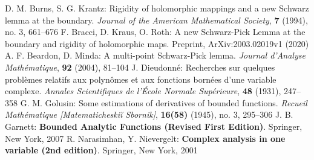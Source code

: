 \begin{thebibliography}{widest entry}
   D. M. Burns, S. G. Krantz: Rigidity of holomorphic mappings and a new Schwarz lemma at the boundary. \textit{Journal of the American Mathematical Society}, \textbf{7} (1994), no. 3, 661--676
   F. Bracci, D. Kraus, O. Roth: A new Schwarz-Pick Lemma at the boundary and rigidity of holomorphic maps. Preprint, ArXiv:2003.02019v1 (2020)
   A. F. Beardon, D. Minda: A multi-point Schwarz-Pick lemma. \textit{Journal d'Analyse Mathématique}, \textbf{92} (2004), 81--104
   J. Dieudonné: Recherches sur quelques problèmes relatifs aux polynômes et aux fonctions bornées d'une variable complexe. \textit{Annales Scientifiques de l'École Normale Supérieure}, \textbf{48} (1931), 247--358
   G. M. Golusin: Some estimations of derivatives of bounded functions. \textit{Recueil Mathématique [Matematicheskiĭ Sbornik]}, \textbf{16(58)} (1945), no. 3, 295--306
   J. B. Garnett: \textbf{Bounded Analytic Functions (Revised First Edition)}. Springer, New York, 2007
   R. Narasimhan, Y. Nievergelt: \textbf{Complex analysis in one variable (2nd edition)}. Springer, New York, 2001
\end{thebibliography}
